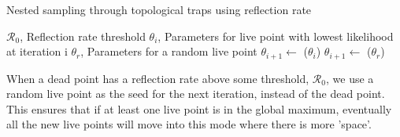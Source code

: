 \documentclass[11pt]{article}
\begin{document}
    \begin{algorithm}
        \caption{Nested sampling through topological traps using reflection rate}
        \label{alg:reflection_rate}
        \begin{algorithmic}
            \VARIABLES
            \STATE $\mathcal{R}_0$, Reflection rate threshold
            \STATE $\theta_i$, Parameters for live point with lowest likelihood at iteration i
            \STATE $\theta_r$, Parameters for a random live point
            \ENDVARIABLES
            \STATE
            \STATE $\theta_{i+1} \gets$ ($\theta_i$)
            \ELSE
            \STATE $\theta_{i+1} \gets$ ($\theta_r$)
            \ENDIF
        \end{algorithmic}
    \end{algorithm}

    When a dead point has a reflection rate above some threshold, $\mathcal{R}_0$, we use a random live point as
    the seed for the next iteration, instead of the dead point.
    This ensures that if at least one live point is in the global maximum, eventually all the new live points will move
    into this mode where there is more 'space'.
\end{document}
